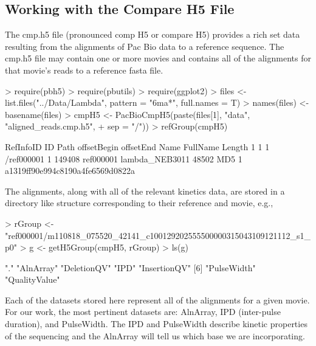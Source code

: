 \documentclass[letterpaper,12pt]{article}
\begin{document}
\subsection{Working with the Compare H5 File}
The cmp.h5 file (pronounced comp H5 or compare H5) provides a rich set
data resulting from the alignments of Pac Bio data to a reference
sequence. The cmp.h5 file may contain one or more movies and contains
all of the alignments for that movie's reads to a reference fasta
file.
\begin{Schunk}
\begin{Sinput}
> require(pbh5)
> require(pbutils)
> require(ggplot2)
> files <- list.files("../Data/Lambda", pattern = "6ma*", full.names = T)
> names(files) <- basename(files)
> cmpH5 <- PacBioCmpH5(paste(files[1], "data", "aligned_reads.cmp.h5", 
+     sep = "/"))
> refGroup(cmpH5)
\end{Sinput}
\begin{Soutput}
  RefInfoID ID       Path offsetBegin offsetEnd      Name       FullName Length
1         1  1 /ref000001           1    149408 ref000001 lambda_NEB3011  48502
                               MD5
1 a1319ff90e994c8190a4fe6569d0822a
\end{Soutput}
\end{Schunk}
The alignments, along with all of the relevant kinetics data, are
stored in a directory like structure corresponding to their reference
and movie, e.g.,
\begin{Schunk}
\begin{Sinput}
> rGroup <- "ref000001/m110818_075520_42141_c100129202555500000315043109121112_s1_p0"
> g <- getH5Group(cmpH5, rGroup)
> ls(g)
\end{Sinput}
\begin{Soutput}
[1] "."            "AlnArray"     "DeletionQV"   "IPD"          "InsertionQV" 
[6] "PulseWidth"   "QualityValue"
\end{Soutput}
\end{Schunk}
Each of the datasets stored here represent all of the alignments for
a given movie. For our work, the most pertinent datasets are:
AlnArray, IPD (inter-pulse duration), and PulseWidth. The IPD and
PulseWidth describe kinetic properties of the sequencing and the
AlnArray will tell us which base we are incorporating.
\end{document}
